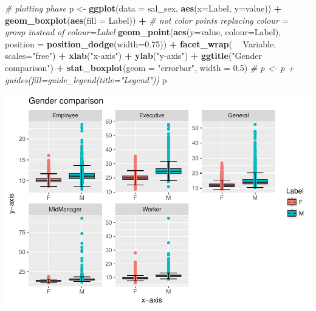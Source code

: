 \documentclass[]{article}
\newenvironment{Shaded}{\begin{snugshade}}{\end{snugshade}}
\newcommand{\KeywordTok}[1]{\textcolor[rgb]{0.13,0.29,0.53}{\textbf{#1}}}
\newcommand{\DataTypeTok}[1]{\textcolor[rgb]{0.13,0.29,0.53}{#1}}
\newcommand{\FloatTok}[1]{\textcolor[rgb]{0.00,0.00,0.81}{#1}}
\newcommand{\StringTok}[1]{\textcolor[rgb]{0.31,0.60,0.02}{#1}}
\newcommand{\CommentTok}[1]{\textcolor[rgb]{0.56,0.35,0.01}{\textit{#1}}}
\newcommand{\OperatorTok}[1]{\textcolor[rgb]{0.81,0.36,0.00}{\textbf{#1}}}
\newcommand{\NormalTok}[1]{#1}
\begin{document}
\begin{Shaded}
\begin{Highlighting}[]
\CommentTok{# plotting phase}
\NormalTok{p <-}\StringTok{  }\KeywordTok{ggplot}\NormalTok{(}\DataTypeTok{data =}\NormalTok{ sal_sex, }\KeywordTok{aes}\NormalTok{(}\DataTypeTok{x=}\NormalTok{Label, }\DataTypeTok{y=}\NormalTok{value)) }\OperatorTok{+}
\StringTok{      }\KeywordTok{geom_boxplot}\NormalTok{(}\KeywordTok{aes}\NormalTok{(}\DataTypeTok{fill =}\NormalTok{ Label)) }\OperatorTok{+}
\StringTok{      }\CommentTok{# not color points replacing colour = group instead of colour=Label}
\StringTok{      }\KeywordTok{geom_point}\NormalTok{(}\KeywordTok{aes}\NormalTok{(}\DataTypeTok{y=}\NormalTok{value, }\DataTypeTok{colour=}\NormalTok{Label), }\DataTypeTok{position =} \KeywordTok{position_dodge}\NormalTok{(}\DataTypeTok{width=}\FloatTok{0.75}\NormalTok{)) }\OperatorTok{+}
\StringTok{      }\KeywordTok{facet_wrap}\NormalTok{( }\OperatorTok{~}\StringTok{ }\NormalTok{Variable, }\DataTypeTok{scales=}\StringTok{"free"}\NormalTok{) }\OperatorTok{+}
\StringTok{      }\KeywordTok{xlab}\NormalTok{(}\StringTok{"x-axis"}\NormalTok{) }\OperatorTok{+}\StringTok{ }\KeywordTok{ylab}\NormalTok{(}\StringTok{"y-axis"}\NormalTok{) }\OperatorTok{+}\StringTok{ }\KeywordTok{ggtitle}\NormalTok{(}\StringTok{"Gender comparison"}\NormalTok{) }\OperatorTok{+}
\StringTok{      }\KeywordTok{stat_boxplot}\NormalTok{(}\DataTypeTok{geom =} \StringTok{"errorbar"}\NormalTok{, }\DataTypeTok{width =} \FloatTok{0.5}\NormalTok{)}
      \CommentTok{# p <- p + guides(fill=guide_legend(title="Legend"))}
\NormalTok{p}
\end{Highlighting}
\end{Shaded}

\includegraphics{TSLproject_files/figure-latex/unnamed-chunk-13-1.pdf}
\end{document}
